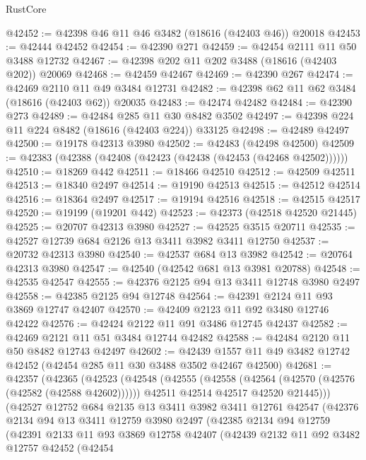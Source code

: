 \begin{lexlean}{RustCore}
\begin{coremodule}
@42452 := @42398 @46 @11 @46 @3482 (@18616 (@42403 @46)) @20018
@42453 := @42444 @42452
@42454 := @42390 @271
@42459 := @42454 @2111 @11 @50 @3488 @12732
@42467 := @42398 @202 @11 @202 @3488 (@18616 (@42403 @202)) @20069
@42468 := @42459 @42467
@42469 := @42390 @267
@42474 := @42469 @2110 @11 @49 @3484 @12731
@42482 := @42398 @62 @11 @62 @3484 (@18616 (@42403 @62)) @20035
@42483 := @42474 @42482
@42484 := @42390 @273
@42489 := @42484 @285 @11 @30 @8482 @3502
@42497 := @42398 @224 @11 @224 @8482 (@18616 (@42403 @224)) @33125
@42498 := @42489 @42497
@42500 := @19178 @42313 @3980
@42502 := @42483 (@42498 @42500)
@42509 := @42383 (@42388 (@42408 (@42423 (@42438 (@42453 (@42468 @42502))))))
@42510 := @18269 @442
@42511 := @18466 @42510
@42512 := @42509 @42511
@42513 := @18340 @2497
@42514 := @19190 @42513
@42515 := @42512 @42514
@42516 := @18364 @2497
@42517 := @19194 @42516
@42518 := @42515 @42517
@42520 := @19199 (@19201 @442)
@42523 := @42373 (@42518 @42520 @21445)
@42525 := @20707 @42313 @3980
@42527 := @42525 @3515 @20711
@42535 := @42527 @12739 @684 @2126 @13 @3411 @3982 @3411 @12750
@42537 := @20732 @42313 @3980
@42540 := @42537 @684 @13 @3982
@42542 := @20764 @42313 @3980
@42547 := @42540 (@42542 @681 @13 @3981 @20788)
@42548 := @42535 @42547
@42555 := @42376 @2125 @94 @13 @3411 @12748 @3980 @2497
@42558 := @42385 @2125 @94 @12748
@42564 := @42391 @2124 @11 @93 @3869 @12747 @42407
@42570 := @42409 @2123 @11 @92 @3480 @12746 @42422
@42576 := @42424 @2122 @11 @91 @3486 @12745 @42437
@42582 := @42469 @2121 @11 @51 @3484 @12744 @42482
@42588 := @42484 @2120 @11 @50 @8482 @12743 @42497
@42602 := @42439 @1557 @11 @49 @3482 @12742 @42452 (@42454 @285 @11 @30 @3488 @3502 @42467 @42500)
@42681 := @42357
    (@42365
      (@42523
        (@42548
          (@42555
            (@42558 (@42564 (@42570 (@42576 (@42582 (@42588 @42602))))))
            @42511
            @42514
            @42517
            @42520
            @21445)))
      (@42527
        @12752
        @684
        @2135
        @13
        @3411
        @3982
        @3411
        @12761
        @42547
        (@42376
          @2134
          @94
          @13
          @3411
          @12759
          @3980
          @2497
          (@42385
            @2134
            @94
            @12759
            (@42391
              @2133
              @11
              @93
              @3869
              @12758
              @42407
              (@42439
                @2132
                @11
                @92
                @3482
                @12757
                @42452
                (@42454

\end{coremodule}
\end{lexlean}
